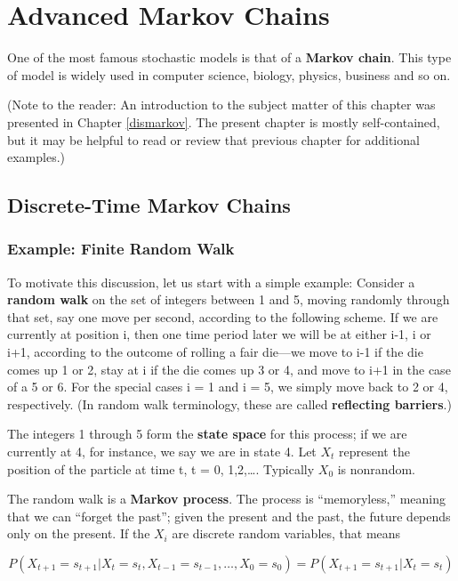 \chapter{Advanced Markov Chains}
\label{mar} 

One of the most famous stochastic models is that of a {\bf Markov chain}.
This type of model is widely used in computer science, biology, physics,
business and so on.

(Note to the reader:  An introduction to the subject matter of this
chapter was presented in Chapter \ref{dismarkov}.  The present chapter
is mostly self-contained, but it may be helpful to read or review that
previous chapter for additional examples.)

\section{Discrete-Time Markov Chains}

\subsection{Example:  Finite Random Walk}
\label{finite}

To motivate this discussion, let us start with a
simple example: Consider a \textbf{random walk} on the set of integers
between 1 and 5, moving randomly through that set, say one move per
second, according to the following scheme.  If we are currently at
position i, then one time period later we will be at either i-1, i or
i+1, according to the outcome of rolling a fair die---we move to i-1 if
the die comes up 1 or 2, stay at i if the die comes up 3 or 4, and move
to i+1 in the case of a 5 or 6. For the special cases i = 1 and i =
5, we simply move back to 2 or 4, respectively.  (In random walk
terminology, these are called {\bf reflecting barriers}.)

The integers 1 through 5 form the \textbf{state space} for this process;
if we are currently at 4, for instance, we say we are in state 4.
Let $X_{t}$ represent the position of the particle at time t, t =
0, 1,2,\ldots{}.  Typically $X_0$ is nonrandom.

The random walk is a \textbf{Markov process}. The process is
``memoryless,'' meaning that we can ``forget the past''; given the
present and the past, the future depends only on the
present.  If the $X_i$ are discrete random variables, that means

\begin{equation}
P(X_{t+1}=s_{t+1}|X_{t}=s_{t},X_{t-1}=s_{t-1},\ldots ,X_{0}=s_{0})=P(X_{t+1}=s_{t+1}|X_{t}=s_{t})
\end{equation}

